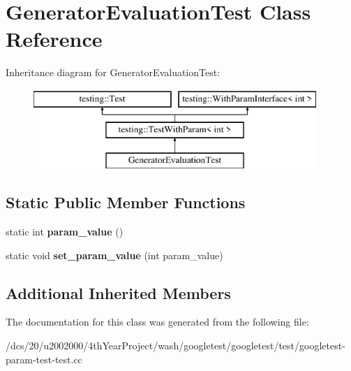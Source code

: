 \hypertarget{classGeneratorEvaluationTest}{}\section{Generator\+Evaluation\+Test Class Reference}
\label{classGeneratorEvaluationTest}
Inheritance diagram for Generator\+Evaluation\+Test\+:\begin{figure}[H]
\begin{center}
\leavevmode
\includegraphics[height=3.000000cm]{classGeneratorEvaluationTest}
\end{center}
\end{figure}
\subsection*{Static Public Member Functions}
\begin{DoxyCompactItemize}
\item 
\mbox{\label{classGeneratorEvaluationTest_ac819769e32b738677401424deb3c8cbe}} 
static int {\bfseries param\+\_\+value} ()
\item 
\mbox{\label{classGeneratorEvaluationTest_ae4f5fb96577dd680d9fa1fd6c3c4af46}} 
static void {\bfseries set\+\_\+param\+\_\+value} (int param\+\_\+value)
\end{DoxyCompactItemize}
\subsection*{Additional Inherited Members}


The documentation for this class was generated from the following file\+:\begin{DoxyCompactItemize}
\item 
/dcs/20/u2002000/4th\+Year\+Project/wash/googletest/googletest/test/googletest-\/param-\/test-\/test.\+cc\end{DoxyCompactItemize}
